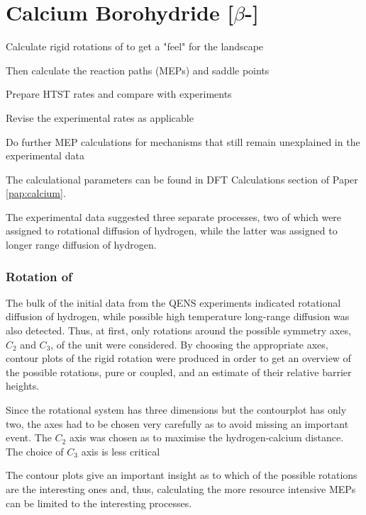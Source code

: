 \section{Calcium Borohydride [$\beta$-]}
\label{sec:borohydrides-calcium}

\bit
\item Calculate rigid rotations of  to get a "feel" for the landscape
\item Then calculate the reaction paths (MEPs) and saddle points
\item Prepare HTST rates and compare with experiments
\item Revise the experimental rates as applicable
\item Do further MEP calculations for mechanisms that still remain unexplained in the experimental data
\eit

The calculational parameters can be found in DFT Calculations section of Paper \ref{pap:calcium}.

The experimental data suggested three separate processes, two of which were assigned to rotational diffusion of hydrogen, while the latter was assigned to longer range diffusion of hydrogen.

\subsubsection{Rotation of }
The bulk of the initial data from the QENS experiments indicated rotational diffusion of hydrogen, while possible high temperature long-range diffusion was also detected.
Thus, at first, only rotations around the possible symmetry axes, $C_2$ and $C_3$, of the  unit were considered.
By choosing the appropriate axes, contour plots of the rigid rotation were produced in order to get an overview of the possible rotations, pure or coupled, and an estimate of their relative barrier heights.


Since the rotational system has three dimensions but the contourplot has only two, the axes had to be chosen very carefully as to avoid missing an important event.
The $C_2$ axis was chosen as to maximise the hydrogen-calcium distance.
The choice of $C_3$ axis is less critical \expand

The contour plots give an important insight as to which of the possible rotations are the interesting ones and, thus, calculating the more resource intensive MEPs can be limited to the interesting processes.

